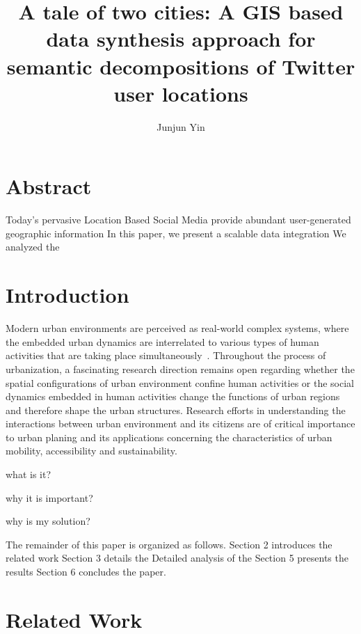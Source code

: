 \documentclass[a4paper,11pt]{article}
\begin{document}
\title{A tale of two cities: A GIS based data synthesis approach for semantic decompositions of Twitter user locations}
\author[1~\thanks{jyn@illinois.edu}]{Junjun Yin}
\renewcommand\Authands{ and }
\maketitle

\section*{Abstract}
Today's pervasive Location Based Social Media provide abundant user-generated geographic information
In this paper, we present a scalable data integration 
We analyzed the 

\section{Introduction}
Modern urban environments are perceived as real-world complex systems, where the embedded urban dynamics are interrelated to various types of human activities that are taking place simultaneously~\cite{jiangyin2014}.
Throughout the process of urbanization, a fascinating research direction remains open regarding whether the spatial configurations of urban environment confine human activities or the social dynamics embedded in human activities change the functions of urban regions and therefore shape the urban structures.
Research efforts in understanding the interactions between urban environment and its citizens are of critical importance to urban planing and its applications concerning the characteristics of urban mobility, accessibility and sustainability.

what is it?

why it is important?

why is my solution?

The remainder of this paper is organized as follows. Section 2 introduces the related work 
Section 3 details the 
Detailed analysis of the
Section 5 presents the results
Section 6 concludes the paper.

\section{Related Work}
\end{document}
